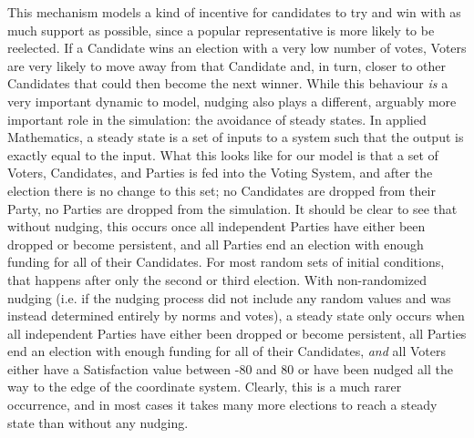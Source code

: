 \documentclass[12pt]{article}
\begin{document}
\qquad This mechanism models a kind of incentive for candidates to try and win with as much support as possible, since a popular representative is more likely to be reelected. If a Candidate wins an election with a very low number of votes, Voters are very likely to move away from that Candidate and, in turn, closer to other Candidates that could then become the next winner. While this behaviour \textit{is} a very important dynamic to model, nudging also plays a different, arguably more important role in the simulation: the avoidance of steady states. In applied Mathematics, a steady state is a set of inputs to a system such that the output is exactly equal to the input. What this looks like for our model is that a set of Voters, Candidates, and Parties is fed into the Voting System, and after the election there is no change to this set; no Candidates are dropped from their Party, no Parties are dropped from the simulation. It should be clear to see that without nudging, this occurs once all independent Parties have either been dropped or become persistent, and all Parties end an election with enough funding for all of their Candidates. For most random sets of initial conditions, that happens after only the second or third election. With non-randomized nudging (i.e. if the nudging process did not include any random values and was instead determined entirely by norms and votes), a steady state only occurs when all independent Parties have either been dropped or become persistent, all Parties end an election with enough funding for all of their Candidates, \textit{and} all Voters either have a Satisfaction value between -80 and 80 or have been nudged all the way to the edge of the coordinate system. Clearly, this is a much rarer occurrence, and in most cases it takes many more elections to reach a steady state than without any nudging. \\
\end{document}

